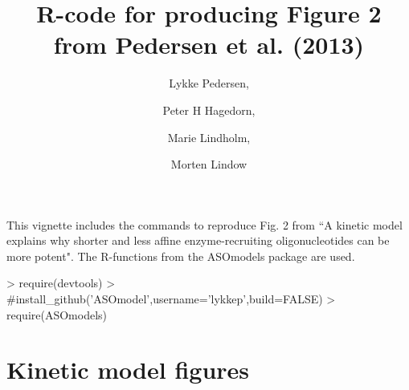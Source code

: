 \documentclass{article}
\title{R-code for producing Figure 2 from Pedersen et al. (2013)}
\author{Lykke Pedersen, \and Peter H Hagedorn, \and Marie Lindholm, \and Morten Lindow}
\date{}
\begin{document}



\maketitle
This vignette includes the commands to reproduce Fig. 2 from ``A kinetic model explains why shorter and less
affine enzyme-recruiting oligonucleotides can be
more potent". The R-functions from the ASOmodels package are used.
\begin{Schunk}
\begin{Sinput}
> require(devtools)
> #install_github('ASOmodel',username='lykkep',build=FALSE)
> require(ASOmodels)
\end{Sinput}
\end{Schunk}

\section*{Kinetic model figures}

\end{document}
